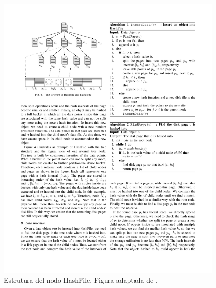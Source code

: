 \begin{figure}[h]
\centering
 \includegraphics[width=0.65\columnwidth]{chapter2/hashfilestructure.pdf}
\caption{Estrutura del nodo HashFile. Figura adaptada de \cite{lshHashFile}.}
\label{fig:HashFile_structure}
\end{figure}


